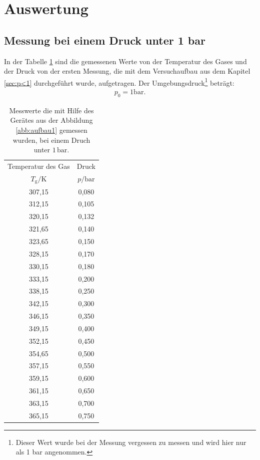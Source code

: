 \newpage
\section{Auswertung}
\label{sec:Auswertung}
\subsection{Messung bei einem Druck unter 1 bar}
In der Tabelle \ref{tab:p<1} sind die gemessenen Werte
von der Temperatur des Gases und der Druck
von der ersten Messung, die mit dem Versuchaufbau aus
dem Kapitel \ref{sec:p<1} durchgeführt wurde, aufgetragen.
Der  Umgebungsdruck\footnote{Dieser Wert wurde bei der Messung vergessen zu messen und wird hier nur als 1 bar angenommen.}
 beträgt:
\begin{align*}
p_\mathrm{0}=1\si{\bar}.
\end{align*}
\begin{table}  %
  \centering
  \caption{Messwerte die mit Hilfe des Gerätes aus der Abbildung \ref{abb:aufbau1} gemessen wurden, bei einem Druch unter $1\,\si{\bar}$.}
  \label{tab:p<1}
  \begin{tabular}{c c}
    \toprule
    Temperatur des Gas &  Druck \\
    $T_\mathrm{g}/ \si{\kelvin}$ & $p/\si{\bar} $ \\
    \midrule
    307,15 & 0,080\\
    312,15 & 0,105\\
    320,15 & 0,132\\
    321,65 & 0,140\\
    323,65 & 0,150\\
    328,15 & 0,170\\
    330,15 & 0,180\\
    333,15 & 0,200\\
    338,15 & 0,250\\
    342,15 & 0,300\\
    346,15 & 0,350\\
    349,15 & 0,400\\
    352,15 & 0,450\\
    354,65 & 0,500\\
    357,15 & 0,550\\
    359,15 & 0,600\\
    361,15 & 0,650\\
    363,15 & 0,700\\
    365,15 & 0,750\\
    \bottomrule
  \end{tabular}
\end{table}
